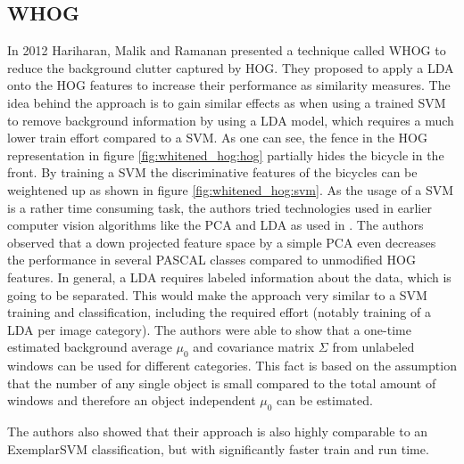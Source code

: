 \subsection{\acf*{WHOG}}
\label{sec:whitened_hog}

In 2012 Hariharan, Malik and Ramanan presented a technique called \acf{WHOG} \cite{Hariharan2012} to reduce the background clutter captured by \ac{HOG}. They proposed to apply a \ac{LDA} onto the \ac{HOG} features to increase their performance as similarity measures. The idea behind the approach is to gain similar effects as when using a trained \ac{SVM} to remove background information by using a \ac{LDA} model, which requires a much lower train effort compared to a \ac{SVM}. As one can see, the fence in the \ac{HOG} representation in figure \ref{fig:whitened_hog:hog} partially hides the bicycle in the front. By training a \ac{SVM} the discriminative features of the bicycles can be weightened up as shown in figure \ref{fig:whitened_hog:svm}. As the usage of a \ac{SVM} is a rather time consuming task, the authors tried technologies used in earlier computer vision algorithms like the \ac{PCA} \cite{jolliffe2002principal} and \ac{LDA} as used in \cite{ahonen2006face}. The authors observed that a down projected feature space by a simple \ac{PCA} even decreases the performance in several PASCAL \cite{Pascal2007} classes compared to unmodified \ac{HOG} features. In general, a \ac{LDA} requires labeled information about the data, which is going to be separated. This would make the approach very similar to a \ac{SVM} training and classification, including the required effort (notably training of a \ac{LDA} per image category). The authors were able to show that a one-time estimated background average $\mu_0$ and covariance matrix $\Sigma$ from unlabeled windows can be used for different categories. This fact is based on the assumption that the number of any single object is small compared to the total amount of windows and therefore an object independent $\mu_0$ can be estimated.

The authors also showed that their approach is also highly comparable to an ExemplarSVM classification, but with significantly faster train and run time. 

